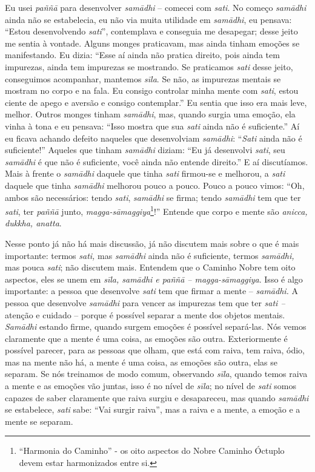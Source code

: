 Eu usei \textit{paññā} para desenvolver \textit{samādhi} –
comecei com \textit{sati}. No começo \textit{samādhi} ainda não se
estabelecia, eu não via muita utilidade em \textit{samādhi}, eu
pensava: “Estou desenvolvendo \textit{sati}”, contemplava e conseguia
me desapegar; desse jeito me sentia à vontade. Alguns monges
praticavam, mas ainda tinham emoções se manifestando. Eu dizia: “Esse
aí ainda não pratica direito, pois ainda tem impurezas, ainda tem
impurezas se mostrando. Se praticamos \textit{sati} desse jeito,
conseguimos acompanhar, mantemos \textit{sīla}. Se não, as impurezas
mentais se mostram no corpo e na fala. Eu consigo controlar minha mente
com \textit{sati}, estou ciente de apego e aversão e consigo
contemplar.” Eu sentia que isso era mais leve, melhor. Outros monges
tinham \textit{samādhi}, mas, quando surgia uma emoção, ela vinha à
tona e eu pensava: “Isso mostra que sua \textit{sati} ainda não é
suficiente.” Aí eu ficava achando defeito naqueles que desenvolviam
\textit{samādhi}: “\textit{Sati} ainda não é suficiente!” Aqueles que
tinham \textit{samādhi} diziam: “Eu já desenvolvi \textit{sati}, seu
\textit{samādhi} é que não é suficiente, você ainda não entende
direito.” E aí discutíamos. Mais à frente o \textit{samādhi} daquele
que tinha \textit{sati} firmou-se e melhorou, a \textit{sati} daquele
que tinha \textit{samādhi} melhorou pouco a pouco. Pouco a pouco
vimos: “Oh, ambos são necessários: tendo \textit{sati},
\textit{samādhi} se firma; tendo \textit{samādhi} tem que ter
\textit{sati}, ter \textit{paññā} junto,
\textit{magga-sāmaggiya}\footnote{“Harmonia do Caminho” - os oito
aspectos do Nobre Caminho Óctuplo devem estar harmonizados entre si.}!”
Entende que corpo e mente são \textit{anicca, dukkha, anatta}. 

Nesse ponto já não há mais discussão, já não discutem mais sobre o
que é mais importante: termos \textit{sati,} mas \textit{samādhi}
ainda não é suficiente, termos \textit{samādhi,} mas pouca
\textit{sati}; não discutem mais. Entendem que o Caminho Nobre tem oito
aspectos, eles se unem em \textit{sīla, samādhi e paññā –
magga-sāmaggiya}. Isso é algo importante: a pessoa que desenvolve
\textit{sati} tem que firmar a mente – \textit{samādhi. }A pessoa que
desenvolve \textit{samādhi} para vencer as impurezas tem que ter
\textit{sati –} atenção e cuidado – porque é possível separar a mente
dos objetos mentais. \textit{Samādhi} estando firme, quando surgem
emoções é possível separá-las. Nós vemos claramente que a mente é uma
coisa, as emoções são outra. Exteriormente é possível parecer, para as
pessoas que olham, que está com raiva, tem raiva, ódio, mas na mente
não há, a mente é uma coisa, as emoções são outra, elas se separam. Se
nós treinamos de modo comum, observando \textit{sīla}, quando temos
raiva a mente e as emoções vão juntas, isso é no nível de
\textit{sīla}; no nível de \textit{sati} somos capazes de saber
claramente que raiva surgiu e desapareceu, mas quando
\textit{samādhi} se estabelece, \textit{sati} sabe: “Vai surgir
raiva”, mas a raiva e a mente, a emoção e a mente se separam. 

